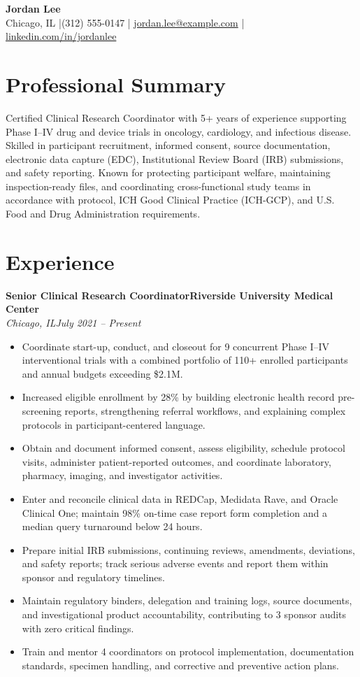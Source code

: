 \documentclass[10pt,letterpaper]{article}
\newcommand{\job}[4]{%
  \textbf{#1}\hfill\textbf{#2}\\[-1pt]
  \textit{#3}\hfill\textit{#4}\par
}
\begin{document}
\begin{center}
  {\LARGE\bfseries Jordan Lee}\\[3pt]
  Chicago, IL \enspace|\enspace (312) 555-0147 \enspace|\enspace
  \href{mailto:jordan.lee@example.com}{jordan.lee@example.com} \enspace|\enspace
  \href{https://www.linkedin.com/in/jordanlee}{linkedin.com/in/jordanlee}
\end{center}
\vspace{-5pt}

\section*{Professional Summary}
Certified Clinical Research Coordinator with 5+ years of experience supporting Phase I--IV drug and device trials in oncology, cardiology, and infectious disease. Skilled in participant recruitment, informed consent, source documentation, electronic data capture (EDC), Institutional Review Board (IRB) submissions, and safety reporting. Known for protecting participant welfare, maintaining inspection-ready files, and coordinating cross-functional study teams in accordance with protocol, ICH Good Clinical Practice (ICH-GCP), and U.S. Food and Drug Administration requirements.

\section*{Experience}
\job{Senior Clinical Research Coordinator}{Riverside University Medical Center}{Chicago, IL}{July 2021 -- Present}
\begin{itemize}
  \item Coordinate start-up, conduct, and closeout for 9 concurrent Phase I--IV interventional trials with a combined portfolio of 110+ enrolled participants and annual budgets exceeding \$2.1M.
  \item Increased eligible enrollment by 28\% by building electronic health record pre-screening reports, strengthening referral workflows, and explaining complex protocols in participant-centered language.
  \item Obtain and document informed consent, assess eligibility, schedule protocol visits, administer patient-reported outcomes, and coordinate laboratory, pharmacy, imaging, and investigator activities.
  \item Enter and reconcile clinical data in REDCap, Medidata Rave, and Oracle Clinical One; maintain 98\% on-time case report form completion and a median query turnaround below 24 hours.
  \item Prepare initial IRB submissions, continuing reviews, amendments, deviations, and safety reports; track serious adverse events and report them within sponsor and regulatory timelines.
  \item Maintain regulatory binders, delegation and training logs, source documents, and investigational product accountability, contributing to 3 sponsor audits with zero critical findings.
  \item Train and mentor 4 coordinators on protocol implementation, documentation standards, specimen handling, and corrective and preventive action plans.
\end{itemize}
\end{document}

